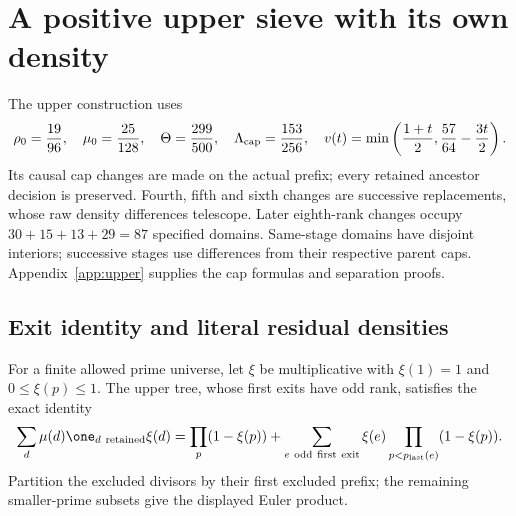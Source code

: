 \section{A positive upper sieve with its own density}
\label{sec:current-upper}

The upper construction uses
\[
 \rho_0=\frac{19}{96},\quad \mu_0=\frac{25}{128},\quad
 \Theta=\frac{299}{500},\quad \Lambda_{\rm cap}=\frac{153}{256},\quad
 v(t)=\min\left(\frac{1+t}{2},\frac{57}{64}-\frac{3t}{2}\right).
\]
Its causal cap changes are made on the actual prefix; every retained
ancestor decision is preserved.  Fourth, fifth and sixth changes are
successive replacements, whose raw density differences telescope.
Later eighth-rank changes occupy $30+15+13+29=87$ specified domains.
Same-stage domains have disjoint interiors; successive stages use
differences from their respective parent caps.  
Appendix~\ref{app:upper} supplies the cap formulas and separation proofs.

\subsection{Exit identity and literal residual densities}

For a finite allowed prime universe, let $\xi$ be multiplicative with
$\xi(1)=1$ and $0\le \xi(p)\le1$. The upper
tree, whose first exits have odd rank, satisfies the exact identity
\begin{equation}
 \sum_d\mu(d){\one}_{d\ {\rm retained}}\xi(d)
 =\prod_p(1-\xi(p))
   +\sum_{e\ {\rm odd\ first\ exit}}\xi(e)
                      \prod_{p<p_{\rm last}(e)}(1-\xi(p)).
 \label{eq:current-upper-exit}
\end{equation}
Partition the excluded divisors by their first excluded prefix; the
remaining smaller-prime subsets give the displayed Euler product.
